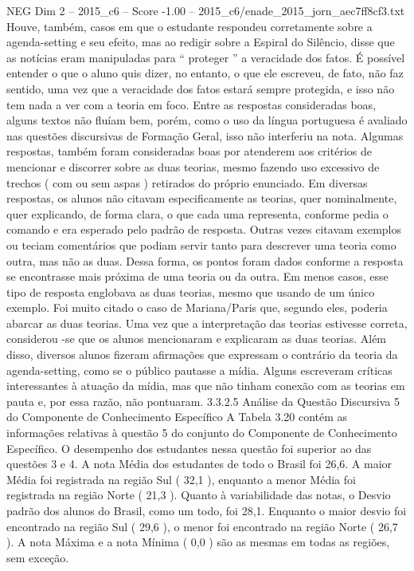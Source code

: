 \begin{textsample}{NEG Dim 2 – 2015\_c6 – Score -1.00 – 2015\_c6/enade\_2015\_jorn\_aec7ff8cf3.txt}
Houve, também, casos em que o estudante respondeu corretamente sobre a agenda-setting e seu efeito, mas ao redigir sobre a Espiral do Silêncio, disse que as notícias eram manipuladas para “ proteger ” a veracidade dos fatos.
É possível entender o que o aluno quis dizer, no entanto, o que ele escreveu, de fato, não faz sentido, uma vez que a veracidade dos fatos estará sempre protegida, e isso não tem nada a ver com a teoria em foco.
Entre as respostas consideradas boas, alguns textos não fluíam bem, porém, como o uso da língua portuguesa é avaliado nas questões discursivas de Formação Geral, isso não interferiu na nota.
Algumas respostas, também foram consideradas boas por atenderem aos critérios de mencionar e discorrer sobre as duas teorias, mesmo fazendo uso excessivo de trechos ( com ou sem aspas ) retirados do próprio enunciado.
Em diversas respostas, os alunos não citavam especificamente as teorias, quer nominalmente, quer explicando, de forma clara, o que cada uma representa, conforme pedia o comando e era esperado pelo padrão de resposta.
Outras vezes citavam exemplos ou teciam comentários que podiam servir tanto para descrever uma teoria como outra, mas não as duas.
Dessa forma, os pontos foram dados conforme a resposta se encontrasse mais próxima de uma teoria ou da outra.
Em menos casos, esse tipo de resposta englobava as duas teorias, mesmo que usando de um único exemplo.
Foi muito citado o caso de Mariana/Paris que, segundo eles, poderia abarcar as duas teorias.
Uma vez que a interpretação das teorias estivesse correta, considerou -se que os alunos mencionaram e explicaram as duas teorias.
Além disso, diversos alunos fizeram afirmações que expressam o contrário da teoria da agenda-setting, como se o público pautasse a mídia.
Alguns escreveram críticas interessantes à atuação da mídia, mas que não tinham conexão com as teorias em pauta e, por essa razão, não pontuaram. 3.3.2.5 Análise da Questão Discursiva 5 do Componente de Conhecimento Específico A Tabela 3.20 contém as informações relativas à questão 5 do conjunto do Componente de Conhecimento Específico.
O desempenho dos estudantes nessa questão foi superior ao das questões 3 e 4.
A nota Média dos estudantes de todo o Brasil foi 26,6.
A maior Média foi registrada na região Sul ( 32,1 ), enquanto a menor Média foi registrada na região Norte ( 21,3 ).
Quanto à variabilidade das notas, o Desvio padrão dos alunos do Brasil, como um todo, foi 28,1.
Enquanto o maior desvio foi encontrado na região Sul ( 29,6 ), o menor foi encontrado na região Norte ( 26,7 ).
A nota Máxima e a nota Mínima ( 0,0 ) são as mesmas em todas as regiões, sem exceção.

\end{textsample}
